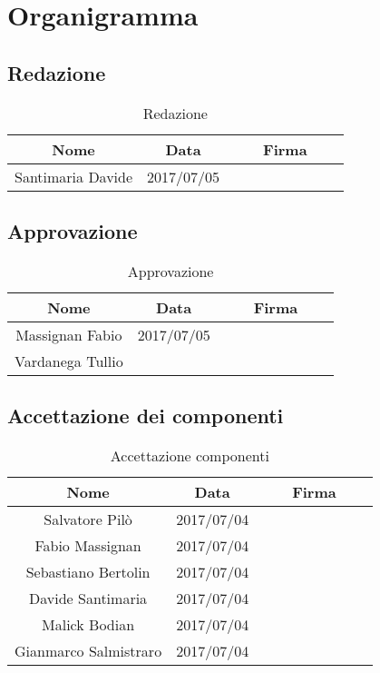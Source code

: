 \section{Organigramma}
	\subsection{Redazione}
	\begin{table}[H]
		\centering
		\begin{tabular}{|c|c|ccccc|}
			\hline
			\textbf{Nome}		& \textbf{Data}	&	&	& \textbf{Firma}	&	& \\
			\hline
			Santimaria Davide	& 		2017/07/05		&     &     &     &     & \\
			\hline
		\end{tabular}
		\caption{Redazione}
	\end{table}
	\subsection{Approvazione}
	\begin{table}[H]
		\centering
		\begin{tabular}{|c|c|ccccc|}
			\hline
			\textbf{Nome}		& \textbf{Data}	&	&	& \textbf{Firma}	&	& \\
			\hline
			Massignan Fabio	& 		2017/07/05		&     &     &     &     & \\
			Vardanega Tullio	& 				&     &     &     &     & \\
			\hline
		\end{tabular}
		\caption{Approvazione}
	\end{table}
	\subsection{Accettazione dei componenti}
	\begin{table}[H]
		\centering
		\begin{tabular}{|c|c|ccccc|}
			\hline
			\textbf{Nome}		& \textbf{Data}	&	&	& \textbf{Firma}	&	& \\
			\hline
			Salvatore Pilò			& 	2017/07/04	&     &     &     &     & \\
			Fabio Massignan			&	2017/07/04	&     &     &     &     & \\
			Sebastiano Bertolin		&	2017/07/04	&     &     &     &     & \\
			Davide Santimaria		&	2017/07/04	&     &     &     &     & \\
			Malick Bodian			& 	2017/07/04	&     &     &     &     & \\
			Gianmarco Salmistraro	&	2017/07/04	&     &     &     &     & \\
			\hline
		\end{tabular}
		\caption{Accettazione componenti}
	\end{table}
